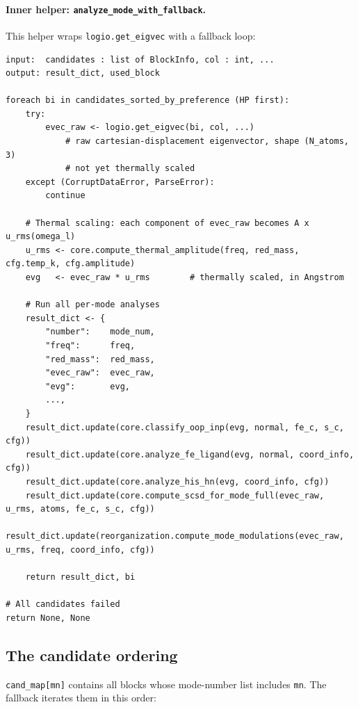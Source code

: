 \documentclass[10pt,a4paper,twoside]{article}
\newcommand{\codref}[1]{%
  \quad\text{\textcolor{gray!70!black}{\footnotesize $\rightsquigarrow$~\texttt{#1}}}}
\newcommand{\fn}[1]{\texttt{#1}}
\begin{document}
\paragraph{Inner helper: \fn{analyze\_mode\_with\_fallback}.}

\codref{core.analyze\_mode\_with\_fallback}

This helper wraps \fn{logio.get\_eigvec} with a fallback loop:

\begin{lstlisting}[style=pseudo,
  caption={Eigenvector loading with fallback. Implementation:
           \protect\fn{core.analyze\_mode\_with\_fallback}.}]
input:  candidates : list of BlockInfo, col : int, ...
output: result_dict, used_block

foreach bi in candidates_sorted_by_preference (HP first):
    try:
        evec_raw <- logio.get_eigvec(bi, col, ...)
            # raw cartesian-displacement eigenvector, shape (N_atoms, 3)
            # not yet thermally scaled
    except (CorruptDataError, ParseError):
        continue

    # Thermal scaling: each component of evec_raw becomes A x u_rms(omega_l)
    u_rms <- core.compute_thermal_amplitude(freq, red_mass, cfg.temp_k, cfg.amplitude)
    evg   <- evec_raw * u_rms        # thermally scaled, in Angstrom

    # Run all per-mode analyses
    result_dict <- {
        "number":    mode_num,
        "freq":      freq,
        "red_mass":  red_mass,
        "evec_raw":  evec_raw,
        "evg":       evg,
        ...,
    }
    result_dict.update(core.classify_oop_inp(evg, normal, fe_c, s_c, cfg))
    result_dict.update(core.analyze_fe_ligand(evg, normal, coord_info, cfg))
    result_dict.update(core.analyze_his_hn(evg, coord_info, cfg))
    result_dict.update(core.compute_scsd_for_mode_full(evec_raw, u_rms, atoms, fe_c, s_c, cfg))
    result_dict.update(reorganization.compute_mode_modulations(evec_raw, u_rms, freq, coord_info, cfg))

    return result_dict, bi

# All candidates failed
return None, None
\end{lstlisting}

\subsection{The candidate ordering}

\fn{cand\_map[mn]} contains all blocks whose mode-number list
includes \texttt{mn}. The fallback iterates them in this order:
\end{document}
